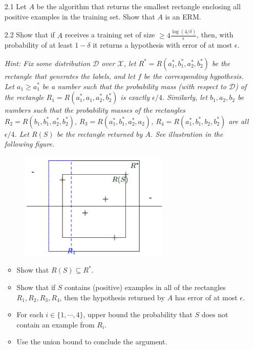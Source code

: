 \documentclass{article}
\begin{document}
\begin{itemize}
	\begin{itemize}
	\item[2.1] Let $A$ be the algorithm that returns the smallest rectangle enclosing all positive examples in the training set. Show that $A$ is an ERM.
	\item[2.2] Show that if $A$ receives a training set of size $\geq 4\frac{\log(4/\delta)}{\epsilon}$, then, with probability of at least $1-\delta$ it returns a hypothesis with error of at most $\epsilon$.
	
	\textit{Hint: Fix some distribution $\mathcal{D}$ over $\mathcal{X}$, let $R^*=R(a^*_1,b^*_1,a^*_2,b^*_2)$ be the rectangle that generates the labels, and let $f$ be the corresponding hypothesis. Let $a_1\geq a^*_1$ be a number such that the probability mass (with respect to $\mathcal{D}$) of the rectangle $R_1=R(a^*_1,a_1,a^*_2,b^*_2)$ is exactly $\epsilon/4$. Similarly, let $b_1,a_2,b_2$ be numbers such that the probability masses of the rectangles $R_2=R(b_1,b^*_1,a^*_2,b^*_2)$, $R_3=R(a^*_1,b^*_1,a^*_2,a_2)$, $R_4=R(a^*_1,b^*_1,b_2,b^*_2)$ are all $\epsilon/4$. Let $R(S)$ be the rectangle returned by $A$. See illustration in the following figure.}
	
	\begin{figure}[!htbp]
	\center
	\includegraphics[scale=.8]{1.png}
	\end{figure}
	
	\begin{itemize}
	\item Show that $R(S)\subseteq R^*$.
	\item Show that if $S$ contains (positive) examples in all of the rectangles $R_1,R_2,R_3,R_4$, then the hypothesis returned by $A$ has error of at most $\epsilon$.
	\item For each $i\in\{1,\cdots,4\}$, upper bound the probability that $S$ does not contain an example from $R_i$.
	\item Use the union bound to conclude the argument.
	\end{itemize}
	 

\end{itemize}
\end{itemize}
\end{document}
